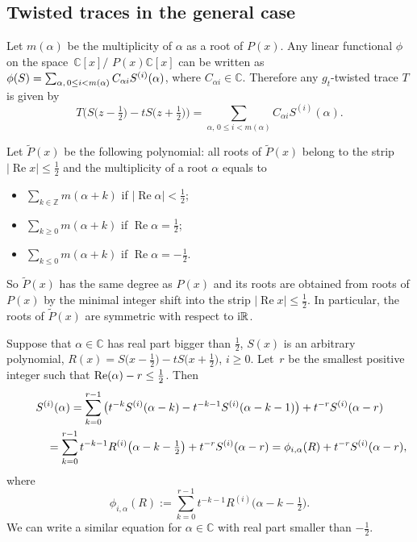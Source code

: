 \documentclass[pdftex]{sigma}
\newcommand{\RN}{\mathbb{R}} %
\newcommand{\CN}{\mathbb{C}} %
\newcommand{\ZN}{\mathbb{Z}} %
\newcommand{\suml}{\sum\limits}
\renewcommand{\Re}{\operatorname{Re}}
\theoremstyle{definition}
\numberwithin{equation}{section}
\begin{document}
\subsection{Twisted traces in the general case}
\label{SubSubSecGeneralTraces}
Let $m(\alpha)$ be the multiplicity of $\alpha$ as a root of $P(x)$. Any linear functional $\phi$ on the space~$\CN[x]/$ $P(x)\CN[x]$ can be written as $\phi(S)=\suml\nolimits_{\alpha,\,0\le i<m(\alpha)}C_{\alpha i} S^{(i)}(\alpha)$, where $C_{\alpha i}\in\CN$. Therefore any $g_t$-twis\-ted trace $T$ is given by
\[
T\big(S\big(z-\tfrac{1}{2}\big)-tS\big(z+\tfrac{1}{2}\big)\big)
=\suml_{\alpha,\,0\le i<m(\alpha)}C_{\alpha i} S^{(i)}(\alpha).
\]

Let $\widetilde{P}(x)$ be the following polynomial: all roots of $\widetilde{P}(x)$ belong to the strip $|\Re x|\leq \frac{1}{2}$ and the multiplicity of a root $\alpha$ equals to
\begin{itemize}
\item
$\sum_{k\in \ZN} m(\alpha+k)$ if $|\Re\alpha|<\frac{1}{2}$;
\item
$\sum_{k\geq 0} m(\alpha+k)$ if $\Re\alpha=\frac{1}{2}$;
\item
$\sum_{k\leq 0} m(\alpha+k)$ if $\Re\alpha=-\frac{1}{2}$.
\end{itemize}
So $\widetilde{P}(x)$ has the same degree as $P(x)$ and its roots are obtained from roots of $P(x)$ by the minimal integer shift into the strip $|\Re x|\leq \frac{1}{2}$. In particular, the roots of $\widetilde{P}(x)$ are symmetric with respect to ${\rm i}\RN$.

Suppose that $\alpha\in \CN$ has real part bigger than $\frac{1}{2}$, $S(x)$ is an arbitrary polynomial, $R(x)=S\big(x-\tfrac{1}{2}\big)-tS\big(x+\frac{1}{2}\big)$, $i\geq 0$. Let~$r$ be the smallest positive integer such that ${\rm Re}(\alpha)-r\leq \frac 12$. Then
\begin{gather*}
S^{(i)}(\alpha)=\sum_{k=0}^{r-1}\big(t^{-k}S^{(i)}(\alpha-k)
-t^{-k-1}S^{(i)}(\alpha-k-1)\big)+t^{-r}S^{(i)}(\alpha-r)
\\ \hphantom{S^{(i)}(\alpha)}
{}=\sum_{k=0}^{r-1}t^{-k-1}R^{(i)}\big(\alpha-k-\tfrac{1}{2}\big)+t^{-r}S^{(i)}(\alpha-r)
=\phi_{i,\alpha}(R)+t^{-r}S^{(i)}(\alpha-r),
\end{gather*}
where
\[
\phi_{i,\alpha}(R):=\sum_{k=0}^{r-1}t^{-k-1}R^{(i)}\big(\alpha-k-\tfrac{1}{2}\big).
\]
We can write a similar equation for $\alpha\in \CN$ with real part smaller than $-\frac{1}{2}$.
\end{document}
